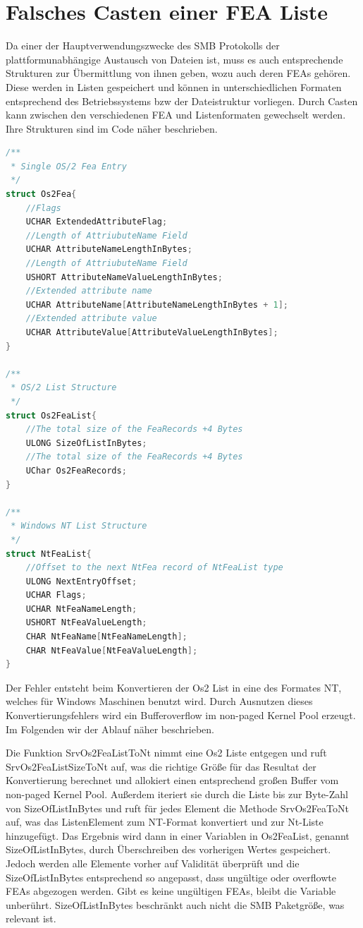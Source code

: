 \documentclass[DIV=12,headings=normal,pdftex,headinclude=false,footinclude=false,final]{scrreprt}
\begin{document}
\section{Falsches Casten einer FEA Liste}
Da einer der Hauptverwendungszwecke des SMB Protokolls der plattformunabhängige Austausch von Dateien  ist, muss es auch entsprechende Strukturen zur Übermittlung von ihnen geben, wozu auch deren FEAs gehören. Diese werden in Listen gespeichert und können in unterschiedlichen Formaten entsprechend des Betriebssystems bzw der Dateistruktur vorliegen. Durch Casten kann zwischen den verschiedenen FEA und Listenformaten gewechselt werden. Ihre Strukturen sind im Code näher beschrieben\cite{CP}.

\begin{lstlisting}[language=C,caption={My Caption},captionpos=b]
/**
 * Single OS/2 Fea Entry
 */
struct Os2Fea{
    //Flags
    UCHAR ExtendedAttributeFlag;
    //Length of AttriubuteName Field
    UCHAR AttributeNameLengthInBytes; 
    //Length of AttriubuteName Field
    USHORT AttributeNameValueLengthInBytes;
    //Extended attribute name
    UCHAR AttributeName[AttributeNameLengthInBytes + 1];
    //Extended attribute value
    UCHAR AttributeValue[AttributeValueLengthInBytes]; 
}
 
/**
 * OS/2 List Structure
 */
struct Os2FeaList{
    //The total size of the FeaRecords +4 Bytes
    ULONG SizeOfListInBytes; 
    //The total size of the FeaRecords +4 Bytes
    UChar Os2FeaRecords;
}
 
/**
 * Windows NT List Structure
 */
struct NtFeaList{
    //Offset to the next NtFea record of NtFeaList type
    ULONG NextEntryOffset;
    UCHAR Flags; 
    UCHAR NtFeaNameLength;
    USHORT NtFeaValueLength;
    CHAR NtFeaName[NtFeaNameLength];
    CHAR NtFeaValue[NtFeaValueLength];
}
\end{lstlisting}

\noindent
Der Fehler entsteht beim Konvertieren der Os2 List in eine des Formates NT, welches für Windows Maschinen benutzt wird. Durch Ausnutzen dieses Konvertierungsfehlers wird ein Bufferoverflow im non-paged Kernel Pool erzeugt. Im Folgenden wir der Ablauf näher beschrieben.

\noindent
Die Funktion SrvOs2FeaListToNt nimmt eine Os2 Liste entgegen und ruft SrvOs2FeaListSizeToNt auf, was die richtige Größe für das Resultat der Konvertierung berechnet und allokiert einen entsprechend großen Buffer vom non-paged Kernel Pool. Außerdem iteriert sie durch die Liste bis zur Byte-Zahl von SizeOfListInBytes und ruft für jedes Element die Methode SrvOs2FeaToNt auf, was das ListenElement zum NT-Format konvertiert und zur Nt-Liste hinzugefügt. Das Ergebnis wird dann in einer Variablen in Os2FeaList, genannt SizeOfListInBytes, durch Überschreiben des vorherigen Wertes gespeichert. Jedoch werden alle Elemente vorher auf Validität überprüft und die SizeOfListInBytes entsprechend so angepasst, dass ungültige oder overflowte FEAs abgezogen werden. Gibt es keine ungültigen FEAs, bleibt die Variable unberührt. SizeOfListInBytes beschränkt auch nicht die SMB Paketgröße, was relevant ist.
\end{document}
